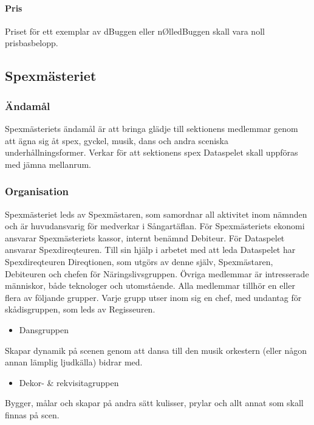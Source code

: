\documentclass{dgovdoc}
\begin{document}
\paragraph{Pris}

Priset för ett exemplar av dBuggen eller nØlledBuggen skall vara noll prisbasbelopp.

\subsection{Spexmästeriet}

\subsubsection{Ändamål}

Spexmästeriets ändamål är att bringa glädje till sektionens medlemmar genom att ägna sig åt spex, gyckel, musik, dans och andra sceniska underhållningsformer. Verkar för att sektionens spex Dataspelet skall uppföras med jämna mellanrum.

\subsubsection{Organisation}

Spexmästeriet leds av Spexmästaren, som samordnar all aktivitet inom nämnden och är huvudansvarig för medverkar i Sångartäflan. För Spexmästeriets ekonomi ansvarar Spexmästeriets kassor, internt benämnd Debiteur. För Dataspelet ansvarar Spexdireqteuren. Till sin hjälp i arbetet med att leda Dataspelet har Spexdireqteuren Direqtionen, som utgörs av denne själv, Spexmästaren, Debiteuren och chefen för Näringslivsgruppen. Övriga medlemmar är intresserade människor, både teknologer och utomstående. Alla medlemmar tillhör en eller flera av följande grupper. Varje grupp utser inom sig en chef, med undantag för skådisgruppen, som leds av Regisseuren.

\begin{itemize}
  \item Dansgruppen
\end{itemize}

Skapar dynamik på scenen genom att dansa till den musik orkestern (eller någon annan lämplig ljudkälla) bidrar med.

\begin{itemize}
  \item Dekor- \& rekvisitagruppen
\end{itemize}

Bygger, målar och skapar på andra sätt kulisser, prylar och allt annat som skall finnas på scen.
\end{document}
